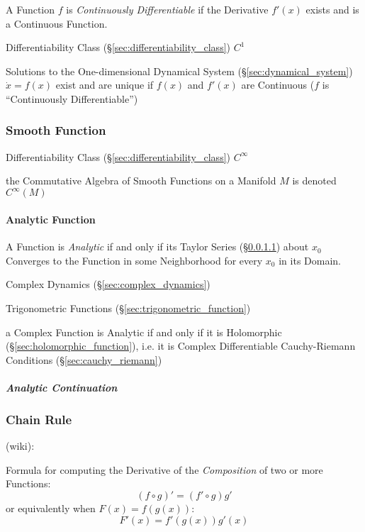 A Function $f$ is \emph{Continuously Differentiable} if the Derivative $f'(x)$
exists and is a Continuous Function.

Differentiability Class (\S\ref{sec:differentiability_class}) $C^1$

Solutions to the One-dimensional Dynamical System
(\S\ref{sec:dynamical_system}) $\dot{x} = f(x)$ exist and are unique if $f(x)$
and $f'(x)$ are Continuous ($f$ is ``Continuously Differentiable'')



\subsubsection{Smooth Function}\label{sec:smooth_function}

Differentiability Class (\S\ref{sec:differentiability_class}) $C^{\infty}$

the Commutative Algebra of Smooth Functions on a Manifold $M$ is denoted
$C^\infty(M)$ %



\paragraph{Analytic Function}\label{sec:analytic_function}\hfill

A Function is \emph{Analytic} if and only if its Taylor Series
(\S\ref{sec:analytic_function}) about $x_0$ Converges to the Function in some
Neighborhood for every $x_0$ in its Domain.

Complex Dynamics (\S\ref{sec:complex_dynamics})

Trigonometric Functions (\S\ref{sec:trigonometric_function})

a Complex Function is Analytic if and only if it is Holomorphic
(\S\ref{sec:holomorphic_function}), i.e. it is Complex Differentiable \fist
Cauchy-Riemann Conditions (\S\ref{sec:cauchy_riemann})



\subparagraph{Analytic Continuation}\label{sec:analytic_continuation}



\subsubsection{Chain Rule}\label{sec:chain_rule}

(wiki):

Formula for computing the Derivative of the \emph{Composition} of two or more
Functions:
\[
  (f \circ g)' = (f' \circ g) g'
\]
or equivalently when $F(x) = f(g(x))$:
\[
  F'(x) = f'(g(x))g'(x)
\]

